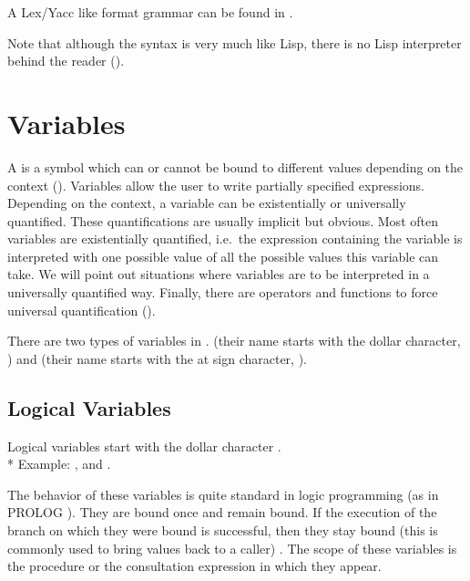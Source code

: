 A Lex/Yacc like format grammar can be found in . 

Note that although the syntax is very much like Lisp, there is no Lisp
interpreter behind the reader ().


\section{Variables}

A  is a symbol which can  or cannot be bound to different
values depending on the context (). Variables
allow the user to write partially specified expressions. Depending on
the context, a variable can be existentially or universally
quantified. These quantifications are usually implicit but obvious. Most often
variables are existentially quantified, i.e.\ the expression containing
the variable is interpreted with one possible value of all the possible values
this variable can take. We will point out situations where variables are
to be interpreted in a universally quantified way. Finally, there are operators
and functions to force universal quantification ().

There are two types of variables in \COPRS. 
(their name starts with the dollar character, \samp{\$}) and  (their name starts with the at sign character, ).



\subsection{Logical Variables}

Logical variables start with the dollar character \samp{\$}.\\*
Example: ,  and .

The behavior of these variables is quite standard in logic programming (as
in PROLOG \cite{Clocksin-Mellish84}).  They are bound once and remain bound. If the 
execution of the branch on which they were bound is successful,
then they stay bound (this is commonly used to bring values back to a caller) .
The scope of these variables is the procedure or the consultation expression in
which they appear.

